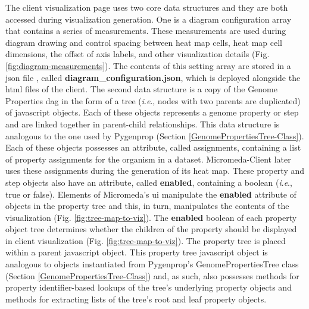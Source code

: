The client visualization page uses two core data structures and they are both 
accessed during visualization generation. One is a diagram configuration array 
that contains a series of measurements. These measurements are used during 
diagram drawing and control spacing between heat map cells, heat map cell 
dimensions, the offset of axis labels, and other visualization details (Fig. 
\ref{fig:diagram-measurements}). The contents of this setting array are stored 
in a \gls{json} file \cite{bray2014rfc}, called 
\textbf{diagram\_configuration.json}, which is deployed alongside the \gls{html} 
files of the client. The second data structure is a copy of the Genome 
Properties \gls{dag} in the form of a tree (\textit{i}.\textit{e}., nodes with 
two parents are duplicated) of \gls{javascript} objects. Each of these objects 
represents a genome property or step and are linked together in parent-child 
relationships. This data structure is analogous to the one used by Pygenprop 
(Section \ref{GenomePropertiesTree-Class}). Each of these objects possesses an 
attribute, called assignments, containing a list of property assignments for the 
organism in a dataset. Micromeda-Client later uses these assignments during the 
generation of its heat map. These property and step objects also have an 
attribute, called \textbf{enabled}, containing a boolean 
(\textit{i}.\textit{e}., true or false). Elements of Micromeda's \gls{ui} 
manipulate the \textbf{enabled} attribute of objects in the property tree and 
this, in turn, manipulates the contents of the visualization (Fig. 
\ref{fig:tree-map-to-viz}). The \textbf{enabled} boolean of each property object 
tree determines whether the children of the property should be displayed in 
client visualization (Fig. \ref{fig:tree-map-to-viz}). The property tree is 
placed within a parent \gls{javascript} object. This property tree 
\gls{javascript} object is analogous to objects instantiated from Pygenprop's 
GenomePropertiesTree class (Section \ref{GenomePropertiesTree-Class}) and, as 
such, also possesses methods for property identifier-based lookups of the tree's 
underlying property objects and methods for extracting lists of the tree's root 
and leaf property objects.

